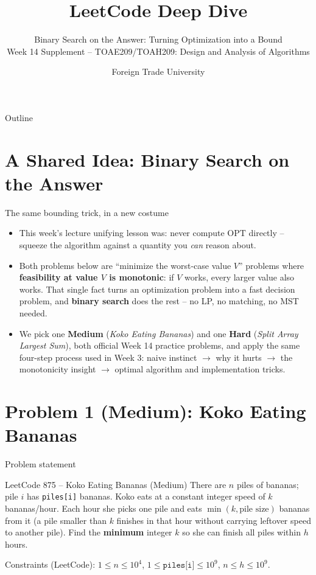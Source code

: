 \documentclass[11pt,aspectratio=169]{beamer}
\title{LeetCode Deep Dive}
\subtitle{Binary Search on the Answer: Turning Optimization into a Bound\\
\small Week 14 Supplement -- TOAE209/TOAH209: Design and Analysis of Algorithms}
\author{Foreign Trade University}
\date{}
\begin{document}
\begin{frame}
  \titlepage
\end{frame}

\begin{frame}{Outline}
  \tableofcontents
\end{frame}

\section{A Shared Idea: Binary Search on the Answer}

\begin{frame}{The same bounding trick, in a new costume}
  \begin{itemize}
    \item This week's lecture unifying lesson was: never compute $\mathrm{OPT}$ directly
    -- squeeze the algorithm against a quantity you \emph{can} reason about.
    \item Both problems below are ``minimize the worst-case value $V$'' problems where
    \textbf{feasibility at value $V$ is monotonic}: if $V$ works, every larger value also
    works. That single fact turns an optimization problem into a fast decision problem,
    and \textbf{binary search} does the rest -- no LP, no matching, no MST needed.
    \item We pick one \textcolor{blue!50!black}{\textbf{Medium}} (\emph{Koko Eating
    Bananas}) and one \textcolor{red!60!black}{\textbf{Hard}} (\emph{Split Array Largest
    Sum}), both official Week 14 practice problems, and apply the same four-step process
    used in Week 3: naive instinct $\to$ why it hurts $\to$ the monotonicity insight
    $\to$ optimal algorithm and implementation tricks.
  \end{itemize}
\end{frame}

\section{Problem 1 (Medium): Koko Eating Bananas}

\begin{frame}{Problem statement}
  \begin{block}{LeetCode 875 -- Koko Eating Bananas (\textcolor{blue!50!black}{Medium})}
    There are $n$ piles of bananas; pile $i$ has \texttt{piles[i]} bananas. Koko eats at
    a constant integer speed of $k$ bananas/hour. Each hour she picks one pile and eats
    $\min(k, \text{pile size})$ bananas from it (a pile smaller than $k$ finishes in that
    hour without carrying leftover speed to another pile). Find the \textbf{minimum}
    integer $k$ so she can finish all piles within $h$ hours.
  \end{block}
  Constraints (LeetCode): $1 \le n \le 10^4$, $1 \le \texttt{piles[i]} \le 10^9$,
  $n \le h \le 10^9$.
\end{frame}
\end{document}
